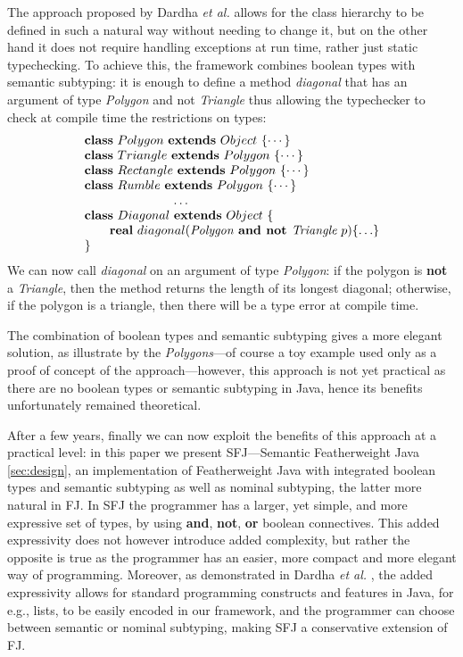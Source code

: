 \documentclass[runningheads]{llncs}
\begin{document}
\begin{example}
The approach proposed by Dardha \emph{et al.} \cite{Dardha2013,Dardha2017} allows for the class hierarchy to be defined in such a natural way without needing to change it, but on the other hand it does not require handling exceptions at run time,  rather just static typechecking.
To achieve this, the framework combines boolean types with semantic subtyping: it is enough to define a method \emph{diagonal} that has an argument of type \emph{Polygon} and not \emph{Triangle} thus allowing the typechecker to check at compile time the restrictions on types:
$$
\begin{array}{l}
\mathbf{class} \  Polygon \ \mathbf{extends }\  Object\ \{\cdots\}
\\
\mathbf{class} \  Triangle \ \mathbf{extends }\  Polygon\ \{\cdots\}
\\
\mathbf{class} \  Rectangle \ \mathbf{extends }\  Polygon\ \{\cdots\}
\\
\mathbf{class} \  Rumble \ \mathbf{extends }\  Polygon\ \{\cdots\}
\\
\hspace{2.5cm} \ldots
\\
\mathbf{class} \  Diagonal \ \mathbf{extends }\  Object\ \{
	\\
	\qquad \mathbf{real}\ diagonal(\textit{Polygon} \textbf{ and not }  \textit{Triangle} \ p)\{\ldots\}
	\\
\}
\end{array}
$$
We can now call \emph{diagonal} on an argument of type \emph{Polygon}: if the polygon is \textbf{not} a \emph{Triangle}, then the method returns the length of its longest diagonal; otherwise, if the polygon is a triangle, then there will be a type error at compile time.
\end{example}
The combination of boolean types and semantic subtyping gives a more elegant solution, as illustrate by the \emph{Polygons}---of course a toy example used only as a proof of concept of the approach---however, this approach is not yet practical as there are no boolean types or semantic subtyping in Java, hence its benefits unfortunately remained theoretical.

After a few years, finally we can now exploit the benefits of this approach at a practical level: in this paper we present SFJ---Semantic Featherweight Java \autoref{sec:design}, an implementation of Featherweight Java with integrated boolean types and semantic subtyping as well as nominal subtyping, the latter more natural in FJ.
In SFJ the programmer has a larger, yet simple, and more expressive set of types, by using \textbf{and}, \textbf{not}, \textbf{or} boolean connectives. This added expressivity does not however introduce added complexity, but rather the opposite is true as the programmer has an easier, more compact and more elegant way of programming. Moreover, as demonstrated in Dardha \emph{et al.} \cite[\S 8.4]{Dardha2017}, the added expressivity allows for standard programming constructs and features in Java, for e.g., lists, to be easily encoded in our framework, and the programmer can choose between semantic or nominal subtyping, making SFJ a conservative extension of FJ.
\end{document}
